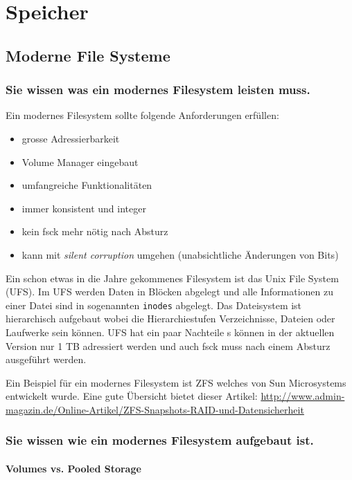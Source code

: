 \chapter{Speicher}

\section{Moderne File Systeme}

\subsection{Sie wissen was ein modernes Filesystem leisten muss.}

Ein modernes Filesystem sollte folgende Anforderungen erfüllen:
\begin{itemize}
	\item grosse Adressierbarkeit
	\item Volume Manager eingebaut
	\item umfangreiche Funktionalitäten
	\item immer konsistent und integer
	\item kein fsck mehr nötig nach Absturz
	\item kann mit \emph{silent corruption} umgehen (unabsichtliche Änderungen von Bits)
\end{itemize}
Ein schon etwas in die Jahre gekommenes Filesystem ist das Unix File System (UFS). Im UFS werden Daten in Blöcken abgelegt und alle Informationen zu einer Datei sind in sogenannten \texttt{inodes} abgelegt. Das Dateisystem ist hierarchisch aufgebaut wobei die Hierarchiestufen Verzeichnisse, Dateien oder Laufwerke sein können. UFS hat ein paar Nachteile s können in der aktuellen Version nur 1 TB adressiert werden und auch fsck muss nach einem Absturz ausgeführt werden.

Ein Beispiel für ein modernes Filesystem ist ZFS welches von Sun Microsystems entwickelt wurde. Eine gute Übersicht bietet dieser Artikel: \href{http://www.admin-magazin.de/Online-Artikel/ZFS-Snapshots-RAID-und-Datensicherheit}{http://www.admin-magazin.de/Online-Artikel/ZFS-Snapshots-RAID-und-Datensicherheit}

\subsection{Sie wissen wie ein modernes Filesystem aufgebaut ist.}

\subsubsection{Volumes vs. Pooled Storage}

